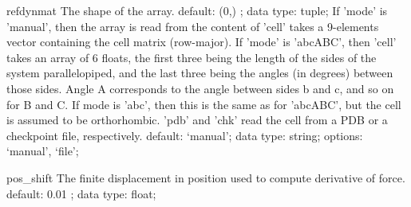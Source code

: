 \begin{ipifield}{}
\begin{ipifield}{refdynmat}
{%
{The shape of the array.}%
{default:  (0,) ; data type: tuple; }%
%
{If 'mode' is 'manual', then the array is read from the content of 'cell' takes a 9-elements vector containing the cell matrix (row-major). If 'mode' is 'abcABC', then 'cell' takes an array of 6 floats, the first three being the length of the sides of the system parallelopiped, and the last three being the angles (in degrees) between those sides. Angle A corresponds to the angle between sides b and c, and so on for B and C. If mode is 'abc', then this is the same as for 'abcABC', but the cell is assumed to be orthorhombic. 'pdb' and 'chk' read the cell from a PDB or a checkpoint file, respectively.}%
{default: `manual'; data type: string; options: `manual', `file'; }%
}
\end{ipifield}
\begin{ipifield}{pos\_shift}%
{The finite displacement in position used to compute derivative of force.}%
{default:  0.01 ; data type: float; }%
{}
\end{ipifield}
\end{ipifield}

